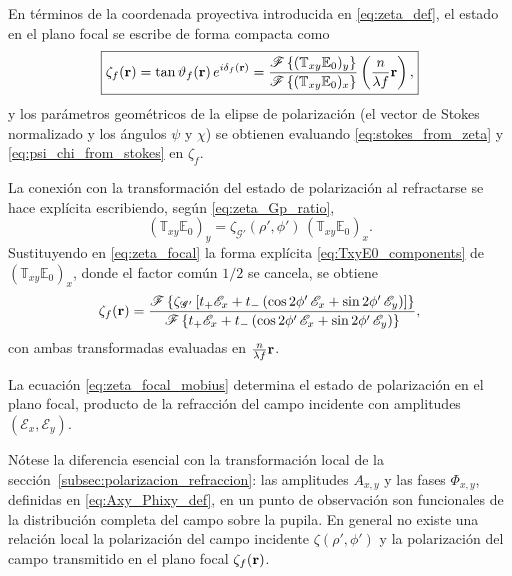 En términos de la coordenada proyectiva introducida en \eqref{eq:zeta_def}, el
estado en el plano focal se escribe de forma compacta como
\begin{equation}
\boxed{
\zeta_f(\vb r)
=
\tan \vartheta_f(\vb r)\,e^{i\delta_f(\vb r)}
=
\frac{
\mathscr F
\left\{
(\mathbb{T}_{xy}\mathbb E_0)_y
\right\}
}{
\mathscr F
\left\{
(\mathbb{T}_{xy}\mathbb E_0)_x
\right\}
}
\left(
\frac{n}{\lambda f}\vb r
\right),
}
\label{eq:zeta_focal}
\end{equation}
y los parámetros geométricos de la elipse de polarización (el vector de Stokes
normalizado y los ángulos $\psi$ y $\chi$) se obtienen evaluando
\eqref{eq:stokes_from_zeta} y \eqref{eq:psi_chi_from_stokes} en $\zeta_f$.

La conexión con la transformación del estado de polarización al refractarse se
hace explícita escribiendo, según \eqref{eq:zeta_Gp_ratio},
\begin{equation*}
(\mathbb{T}_{xy}\mathbb E_0)_y
=
\zeta_{\mathscr{G}'}(\rho',\phi')\,
(\mathbb{T}_{xy}\mathbb E_0)_x.
\end{equation*}
Sustituyendo en \eqref{eq:zeta_focal} la forma explícita
\eqref{eq:TxyE0_components} de $(\mathbb{T}_{xy}\mathbb E_0)_x$, donde el
factor común $1/2$ se cancela, se obtiene
\begin{equation}
\zeta_f(\vb r)
=
\frac{
\mathscr F
\left\{
\zeta_{\mathscr{G}'}
\left[
t_+\mathscr E_x
+
t_-
\left(
\cos 2\phi'\, \mathscr E_x
+
\sin 2\phi'\, \mathscr E_y
\right)
\right]
\right\}
}{
\mathscr F
\left\{
t_+\mathscr E_x
+
t_-
\left(
\cos 2\phi'\, \mathscr E_x
+
\sin 2\phi'\, \mathscr E_y
\right)
\right\}
},
\label{eq:zeta_focal_mobius}
\end{equation}
con ambas transformadas evaluadas en $\frac{n}{\lambda f}\vb r$.

La ecuación \eqref{eq:zeta_focal_mobius} determina el estado de polarización 
en el plano focal, producto de la refracción del campo incidente con amplitudes 
$(\mathscr E_x, \mathscr E_y)$.

Nótese la diferencia esencial con la transformación local de la
sección~\ref{subsec:polarizacion_refraccion}: las amplitudes $A_{x,y}$ y
las fases $\Phi_{x,y}$, definidas en \eqref{eq:Axy_Phixy_def}, en un punto de observación son funcionales de la distribución completa del campo sobre la pupila. En general no
existe una relación local la polarización del campo incidente $\zeta(\rho',\phi')$ y la polarización del campo transmitido en el plano focal $\zeta_f(\vb r)$.


